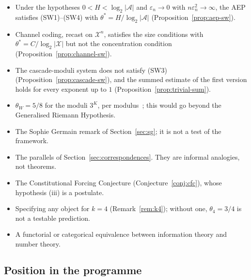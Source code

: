 \documentclass[12pt]{amsart}
\theoremstyle{plain}
\theoremstyle{definition}
\theoremstyle{remark}
\newcommand{\thetaW}{\theta_W}
\begin{document}
\begin{itemize}
  \item[\textbf{[Proven]}] Under the hypotheses $0 < H < \log_2|\mathcal{A}|$
    and $\varepsilon_n \to 0$ with $n\varepsilon_n^2 \to \infty$, the AEP
    satisfies (SW1)--(SW4) with $\theta^* = H/\log_2|\mathcal{A}|$
    (Proposition~\ref{prop:aep-sw}).

  \item[\textbf{[Proven]}] Channel coding, recast on $\mathcal{X}^n$, satisfies
    the size conditions with $\theta^* = C/\log_2|\mathcal{X}|$ but not the
    concentration condition (Proposition~\ref{prop:channel-sw}).

  \item[\textbf{[Proven]}] The cascade-moduli system does not satisfy (SW3)
    (Proposition~\ref{prop:cascade-sw}), and the summed estimate of the first
    version holds for every exponent up to $1$ (Proposition~\ref{prop:trivial-sum}).

  \item[\textbf{[Conjectured]}] $\thetaW = 5/8$ for the moduli $3^K$, per
    modulus~\cite{WakilEisenstein}; this would go beyond the Generalised Riemann
    Hypothesis.

  \item[\textbf{[Heuristic]}] The Sophie Germain remark of
    Section~\ref{sec:sg}; it is not a test of the framework.

  \item[\textbf{[Analogy]}] The parallels of
    Section~\ref{sec:correspondences}. They are informal analogies, not
    theorems.

  \item[\textbf{[Conjectured]}] The Constitutional Forcing Conjecture
    (Conjecture~\ref{conj:cfc}), whose hypothesis (iii) is a postulate.

  \item[\textbf{[Open]}] Specifying any object for $k = 4$
    (Remark~\ref{rem:k4}); without one, $\theta_4 = 3/4$ is not a testable
    prediction.

  \item[\textbf{[Not claimed]}] A functorial or categorical equivalence between
    information theory and number theory.
\end{itemize}

\subsection{Position in the programme}
\end{document}
